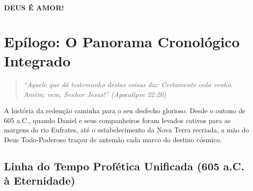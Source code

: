 \documentclass[11pt,a4paper,openany]{book}
\begin{document}
\textbf{DEUS É AMOR!}

\backmatter

\chapter{Epílogo: O Panorama Cronológico Integrado}

\begin{quote}
\itshape
``Aquele que dá testemunho destas coisas diz: Certamente cedo venho. Amém; vem, Senhor Jesus!'' (Apocalipse 22:20)
\end{quote}

A história da redenção caminha para o seu desfecho glorioso. Desde o outono de 605 a.C., quando Daniel e seus companheiros foram levados cativos para as margens do rio Eufrates, até o estabelecimento da Nova Terra recriada, a mão do Deus Todo-Poderoso traçou de antemão cada marco do destino cósmico.

\section*{Linha do Tempo Profética Unificada (605 a.C. à Eternidade)}
\end{document}
